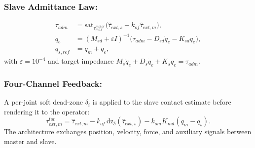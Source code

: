 \documentclass[a4paper, 10pt, conference]{ieeeconf}      %
\begin{document}
\subsubsection{Slave Admittance Law:}
\begin{equation}
\begin{aligned}
\tau_{adm} &= \mathrm{sat}_{\tau_{max}^{motor}}\!\big(\hat{\tau}_{ext,s}-k_{of}\hat{\tau}_{ext,m}\big),\\
\ddot{q}_e &= (M_{sd}+\varepsilon I)^{-1}\big(\tau_{adm}-D_{sd}\dot{q}_e-K_{sd}q_e\big),\\
q_{s,ref} &= q_m+q_e,
\end{aligned}
\end{equation}
with $\varepsilon=10^{-4}$ and target impedance $M_s\ddot{q}_e+D_s\dot{q}_e+K_sq_e=\tau_{adm}$.

\subsubsection{Four-Channel Feedback:}
A per-joint soft dead-zone $\delta_i$ is applied to the slave contact estimate
before rendering it to the operator:
\begin{equation}
\tau_{ext,m}^{tot}=\hat{\tau}_{ext,m}
-k_{of}\,\mathrm{dz}_{\delta}(\hat{\tau}_{ext,s})
-k_{om}K_{md}(q_m-q_s).
\end{equation}
The architecture exchanges position, velocity, force, and auxiliary signals
between master and slave.

\end{document}
